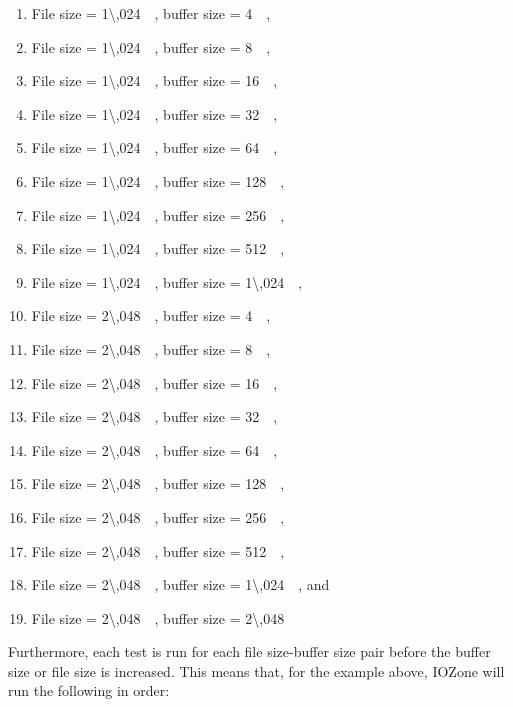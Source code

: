 \begin{enumerate}
	\item File size = \SI{1\,024}{\kilo\byte}, buffer size = \SI{4}{\kilo\byte},
	\item File size = \SI{1\,024}{\kilo\byte}, buffer size = \SI{8}{\kilo\byte},
	\item File size = \SI{1\,024}{\kilo\byte}, buffer size = \SI{16}{\kilo\byte},
	\item File size = \SI{1\,024}{\kilo\byte}, buffer size = \SI{32}{\kilo\byte},
	\item File size = \SI{1\,024}{\kilo\byte}, buffer size = \SI{64}{\kilo\byte},
	\item File size = \SI{1\,024}{\kilo\byte}, buffer size = \SI{128}{\kilo\byte},
	\item File size = \SI{1\,024}{\kilo\byte}, buffer size = \SI{256}{\kilo\byte},
	\item File size = \SI{1\,024}{\kilo\byte}, buffer size = \SI{512}{\kilo\byte},
	\item File size = \SI{1\,024}{\kilo\byte}, buffer size = \SI{1\,024}{\kilo\byte},
	\item File size = \SI{2\,048}{\kilo\byte}, buffer size = \SI{4}{\kilo\byte},
	\item File size = \SI{2\,048}{\kilo\byte}, buffer size = \SI{8}{\kilo\byte},
	\item File size = \SI{2\,048}{\kilo\byte}, buffer size = \SI{16}{\kilo\byte},
	\item File size = \SI{2\,048}{\kilo\byte}, buffer size = \SI{32}{\kilo\byte},
	\item File size = \SI{2\,048}{\kilo\byte}, buffer size = \SI{64}{\kilo\byte},
	\item File size = \SI{2\,048}{\kilo\byte}, buffer size = \SI{128}{\kilo\byte},
	\item File size = \SI{2\,048}{\kilo\byte}, buffer size = \SI{256}{\kilo\byte},
	\item File size = \SI{2\,048}{\kilo\byte}, buffer size = \SI{512}{\kilo\byte},
	\item File size = \SI{2\,048}{\kilo\byte}, buffer size = \SI{1\,024}{\kilo\byte}, and
	\item File size = \SI{2\,048}{\kilo\byte}, buffer size = \SI{2\,048}{\kilo\byte}
\end{enumerate}
Furthermore, each test is run for each file size-buffer size pair before the buffer size or file size is increased. This means that, for the example above, IOZone will run the following in order:
